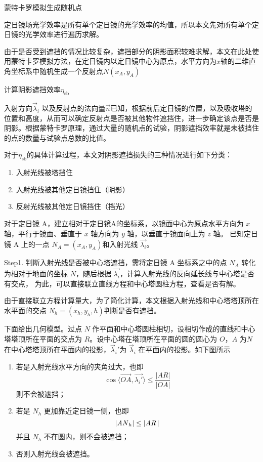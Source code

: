 \documentclass[../main.tex]{subfiles}
\begin{document}
蒙特卡罗模拟生成随机点

定日镜场光学效率是所有单个定日镜的光学效率的均值，所以本文先对所有单个定日镜的光学效率进行遍历求解。

由于是否受到遮挡的情况比较复杂，遮挡部分的阴影面积较难求解，本文在此处使用蒙特卡罗模拟方法，在定日镜内以定日镜中心为原点，水平方向为\(x\)轴的二维直角坐标系中随机生成一个反射点\(N(x_A,y_A)\)

计算阴影遮挡效率\(\eta_{\mathrm{s b}}\)\par
入射方向\(\vec \lambda _{i}\) 以及反射点的法向量\(\vec n\)已知，根据前后定日镜的位置，以及吸收塔的位置和高度，从而可以确定反射点是否被其他物件遮挡住，进一步确定该点是否是阴影。根据蒙特卡罗原理，通过大量的随机点的试验，阴影遮挡效率就是未被挡住的点的数量与试验点总数的比值。

对于\(\eta _{\mathrm{s b}}\)的具体计算过程，本文对阴影遮挡损失的三种情况进行如下分类：
\begin{enumerate}
\item 入射光线被塔挡住
\item 入射光线被其他定日镜挡住（阴影）
\item 反射光线被其他定日镜挡住（挡光）
\end{enumerate}
对于定日镜 A，建立相对于定日镜A的坐标系，以镜面中心为原点水平方向为 \(x\) 轴，平行于镜面、垂直于 \(x\) 轴方向为 \(y\) 轴，以垂直于镜面向上为 \(z\) 轴。
已知定日镜 A 上的一点 \(N_{A} = (x_{A}, y_{A})\)和入射光线 \(\vec {\lambda _{i}}\)。

Step1. 判断入射光线是否被中心塔遮挡，需将定日镜 A 坐标系之中的点 \(N_{A}\) 转化为相对于地面的坐标 \(N\)，随后根据 \(\vec {\lambda _{i}}\)，计算入射光线的反向延长线与中心塔是否有交点，
为此，可以直接联立直线方程和中心塔圆柱方程，查看是否有解。

由于直接联立方程计算量大，为了简化计算，本文根据入射光线和中心塔塔顶所在水平面的交点 \(N_{h} = (x _{h} , y_{h}, h)\)判断是否有遮挡。

下面给出几何模型。过点 \(N\) 作平面和中心塔圆柱相切，设相切作成的直线和中心塔塔顶所在平面的交点为 \(R\)。设中心塔在塔顶所在平面的圆的圆心为 \(O\)，\(A\) 为\(N\)在中心塔塔顶所在平面内的投影，\(\vec \lambda _{i} '\)为 \(\vec \lambda _{i}\) 在平面内的投影。如下图所示

\begin{enumerate}
\item 若是入射光线水平方向的夹角过大，也即
\begin{equation}
\cos \langle \overrightarrow {OA}, \vec {\lambda _{i} '} \rangle \le \frac{\vert AR \vert }{\vert OA \vert }
\end{equation}
则不会被遮挡；
\item 若是 \(N_{h}\) 更加靠近定日镜一侧，也即
\begin{equation}
\vert {\it A N}_{h}\vert \le \vert {\it AR\,} \vert
\end{equation}并且 \(N_{h}\) 不在圆内，则不会被遮挡；
\item 否则入射光线会被遮挡。
\end{enumerate}
\end{document}
